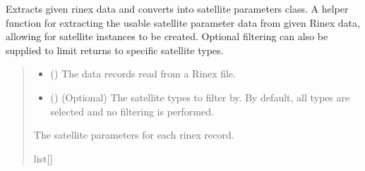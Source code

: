 \documentclass[letterpaper,10pt,english]{sphinxmanual}
\begin{document}
\begin{fulllineitems}
\label{\detokenize{modules/gps/ephemeris:qnav.gps.ephemeris.rinex_to_satellite_params}}
\pysigstartsignatures
{}
\pysigstopsignatures
\sphinxAtStartPar
Extracts given rinex data and converts into satellite parameters class.
A helper function for extracting the usable satellite parameter data
from given Rinex data, allowing for satellite instances to be created.
Optional filtering can also be supplied to limit returns to specific
satellite types.
\begin{quote}\begin{description}
\begin{itemize}
\item {} 
\sphinxAtStartPar
{} (\sphinxstyleliteralemphasis{\sphinxupquote{{[}}}\sphinxstyleliteralemphasis{\sphinxupquote{, }}\sphinxstyleliteralemphasis{\sphinxupquote{{]}}}) \textendash{} The data records read from a Rinex file.

\item {} 
\sphinxAtStartPar
{} ({\hyperref[\detokenize{modules/gps/ephemeris:qnav.gps.ephemeris.SatelliteType}]{}}) \textendash{} (Optional) The satellite types to filter by.
By default, all types are selected and no filtering is performed.

\end{itemize}

\sphinxAtStartPar
The satellite parameters for each rinex record.

\sphinxAtStartPar
list{[}{\hyperref[\detokenize{modules/gps/satellite:qnav.gps.satellite.SatelliteParams}]{}}{]}

\end{description}\end{quote}

\end{fulllineitems}
\end{document}
